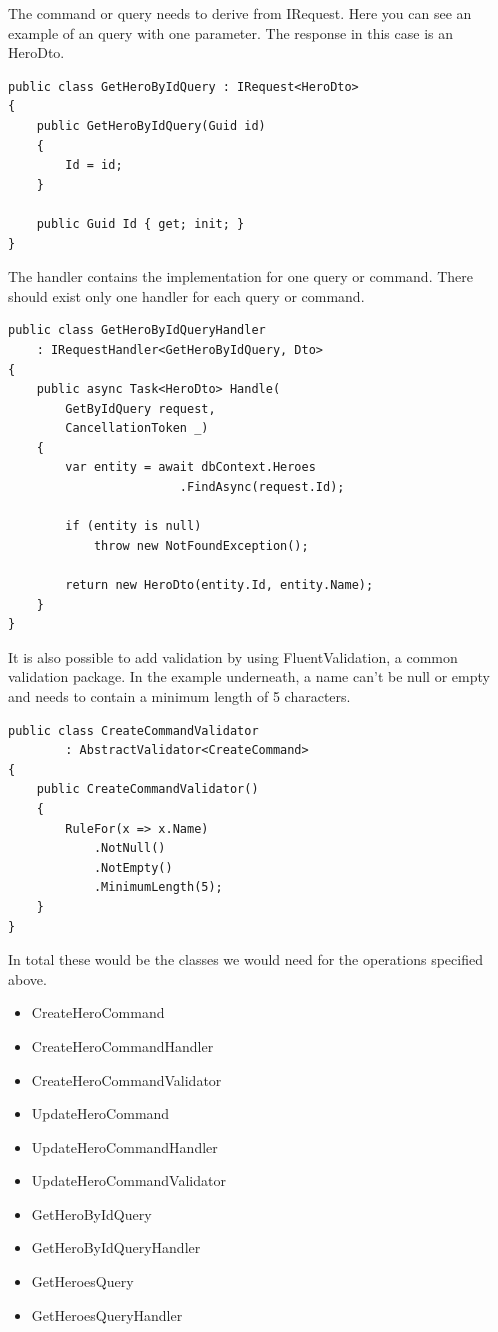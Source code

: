 \documentclass[11pt,conference]{IEEEtran}
\begin{document}
The command or query needs to derive from IRequest.
Here you can see an example of an query with one parameter.
The response in this case is an HeroDto.

\begin{lstlisting}[caption=Query]
public class GetHeroByIdQuery : IRequest<HeroDto>
{
    public GetHeroByIdQuery(Guid id)
    {
        Id = id;
    }

    public Guid Id { get; init; }
}
\end{lstlisting}

The handler contains the implementation for one query or command.
There should exist only one handler for each query or command.

\begin{lstlisting}[caption=Query Handler]
public class GetHeroByIdQueryHandler
    : IRequestHandler<GetHeroByIdQuery, Dto>
{
    public async Task<HeroDto> Handle(
        GetByIdQuery request,
        CancellationToken _)
    {
        var entity = await dbContext.Heroes
                        .FindAsync(request.Id);

        if (entity is null)
            throw new NotFoundException();

        return new HeroDto(entity.Id, entity.Name);
    }
}
\end{lstlisting}

It is also possible to add validation by using FluentValidation, a common validation package.
In the example underneath, a name can't be null or empty and needs to contain a minimum length of 5 characters.

\begin{lstlisting}[caption=Validator]
public class CreateCommandValidator  
        : AbstractValidator<CreateCommand>
{
    public CreateCommandValidator()
    {
        RuleFor(x => x.Name)
            .NotNull()
            .NotEmpty()
            .MinimumLength(5);
    }
}
\end{lstlisting}

In total these would be the classes we would need for the operations specified above.

\begin{itemize}
    \item {CreateHeroCommand}
    \item {CreateHeroCommandHandler}
    \item {CreateHeroCommandValidator}
    \item {UpdateHeroCommand}
    \item {UpdateHeroCommandHandler}
    \item {UpdateHeroCommandValidator}
    \item {GetHeroByIdQuery}
    \item {GetHeroByIdQueryHandler}
    \item {GetHeroesQuery}
    \item {GetHeroesQueryHandler}
\end{itemize}
\end{document}
